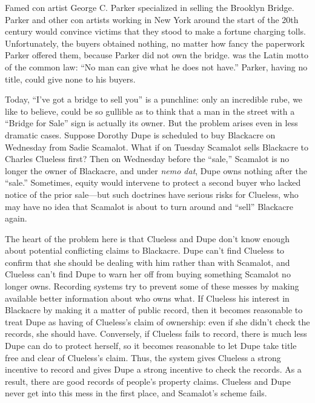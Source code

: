 Famed con artist George C. Parker specialized in selling the Brooklyn Bridge.
Parker and other con artists working in New York around the start of the 20th
century would convince victims that they stood to make a fortune charging
tolls. Unfortunately, the buyers obtained nothing, no matter how fancy the
paperwork Parker offered them, because Parker did not own the bridge.
 was the Latin motto of the common law:
``No man can give what he does not have.'' Parker, having no title, could give
none to his buyers.

Today, ``I've got a bridge to sell you'' is a punchline: only an incredible
rube, we like to believe, could be so gullible as to think that a man in the
street with a ``Bridge for Sale'' sign is actually its owner. But the problem
arises even in less dramatic cases. Suppose Dorothy Dupe is scheduled to buy
Blackacre on Wednesday from Sadie Scamalot. What if on Tuesday Scamalot sells
Blackacre to Charles Clueless first? Then on Wednesday before the ``sale,''
Scamalot is no longer the owner of Blackacre, and under \textit{nemo dat}, Dupe
owns nothing after the ``sale.'' Sometimes, equity would intervene to protect a
second buyer who lacked notice of the prior sale---but such doctrines have
serious risks for Clueless, who may have no idea that Scamalot is about to turn
around and ``sell'' Blackacre again.

The heart of the problem here is that Clueless and Dupe don't know enough about
potential conflicting claims to Blackacre. Dupe can't find Clueless to confirm
that she should be dealing with him rather than with Scamalot, and Clueless
can't find Dupe to warn her off from buying something Scamalot no longer owns.
Recording systems try to prevent some of these messes by making available
better information about who owns what. If Clueless 
his
interest in Blackacre by making it a matter of public record, then it becomes
reasonable to treat Dupe as having  of
Clueless's claim of ownership: even if she didn't check the records, she should
have. Conversely, if Clueless fails to record, there is much less Dupe can do
to protect herself, so it becomes reasonable to let Dupe take title free and
clear of Clueless's claim. Thus, the system gives Clueless a strong incentive
to record and gives Dupe a strong incentive to check the records. As a result,
there are good records of people's property claims. Clueless and Dupe never get
into this mess in the first place, and Scamalot's scheme fails.

